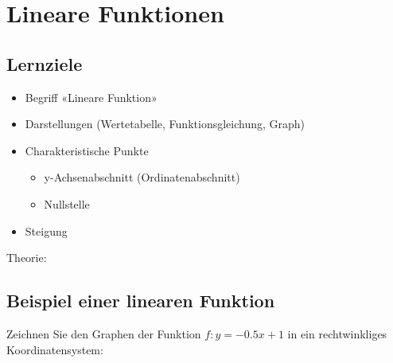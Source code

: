 
\section{Lineare Funktionen}
\label{lineare_funktionen}
\subsection*{Lernziele}

\begin{itemize}
\item Begriff «Lineare Funktion»
\item Darstellungen (Wertetabelle, Funktionsgleichung, Graph)
\item Charakteristische Punkte
  \begin{itemize}
  \item
    y-Achsenabschnitt (Ordinatenabschnitt)
  \item Nullstelle
  \end{itemize}
\item Steigung
\end{itemize}

Theorie:
\newpage

\subsection{Beispiel einer linearen Funktion}
Zeichnen Sie den Graphen der Funktion $f: y= -0.5x + 1$ in ein rechtwinkliges Koordinatensystem:



